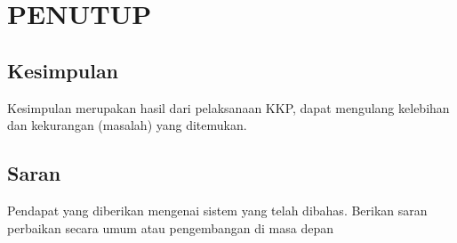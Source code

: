 
\chapter[PENUTUP]{\\ PENUTUP}


\section{Kesimpulan}
\begin{sectioncontent}
    \hspace{\parindent}Kesimpulan merupakan hasil dari pelaksanaan KKP, dapat mengulang kelebihan dan kekurangan (masalah) yang ditemukan.
\end{sectioncontent}

\section{Saran}
\begin{sectioncontent}
    \hspace{\parindent}Pendapat yang diberikan mengenai sistem yang telah dibahas. Berikan saran perbaikan secara umum atau pengembangan di masa depan
\end{sectioncontent}